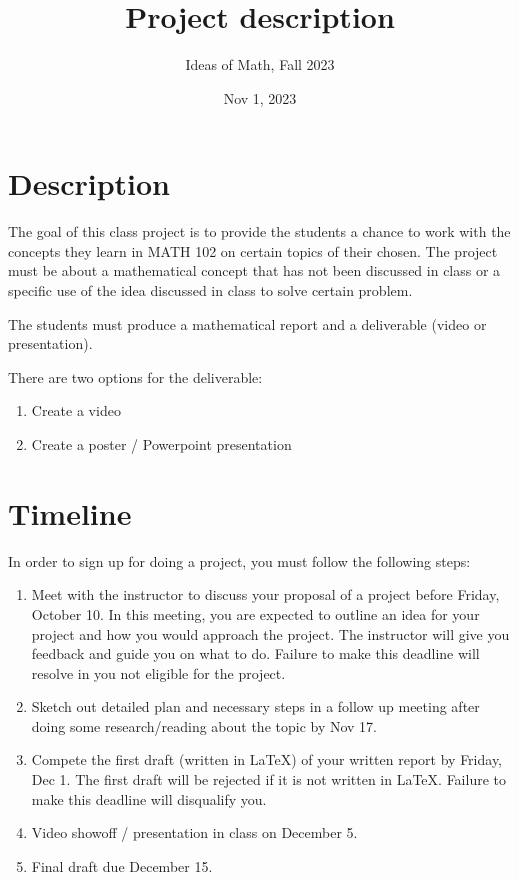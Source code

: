 \documentclass[12pt]{amsart}
\title{ Project description }
\author{Ideas of Math, Fall 2023}
\date{Nov 1, 2023}
\begin{document}
\maketitle


\section{Description}
The goal of this class project is to provide the students a chance to work with
the concepts they learn in MATH 102 on certain topics of their chosen.
The project must be about a mathematical concept that has not been discussed in class
        or a specific use of the idea discussed in class to solve certain problem.
        
        The students must produce a mathematical report and a deliverable (video or presentation).

There are two options for the deliverable:
\begin{enumerate}
    \item Create a video  
    \item Create a poster / Powerpoint presentation
\end{enumerate}

\section{Timeline}
In order to sign up for doing a project, you must follow the following steps:
\begin{enumerate}
    \item Meet with the instructor to discuss your proposal of a project before Friday, October 10. 
        In this meeting, you are expected to outline an idea for your project and 
        how you would approach the project.
        The instructor will give you feedback and guide you on what to do.
    Failure to make this deadline will resolve in you not eligible for the project.
    \item Sketch out detailed plan and necessary steps in a follow up meeting after
    doing some research/reading about the topic by Nov 17.
    \item Compete the first draft (written in LaTeX) of your written report by Friday, Dec 1.
        The first draft will be rejected if it is not written in LaTeX. 
        Failure to make this deadline will disqualify you.
    \item Video showoff / presentation in class on December 5.
    \item Final draft due December 15.
\end{enumerate}
\end{document}
